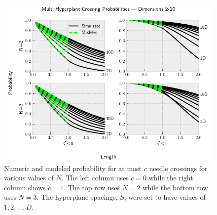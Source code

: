 \documentclass{article}
\begin{document}
\begin{figure}
	\centerline{\includegraphics[width=5in]{numeric_sim_N_le.png}}
	\caption{Numeric and modeled probability for at most $c$ needle crossings for various values of $N$.
	The left column uses $c=0$ while the right column shows $c=1$. The top row uses $N=2$ while the
	bottom row uses $N=3$. The hyperplane spacings, $S$, were set to have values of $1, 2, \hdots, D$.}
	\label{fig:numeric sim N le}
\end{figure}



\end{document}
